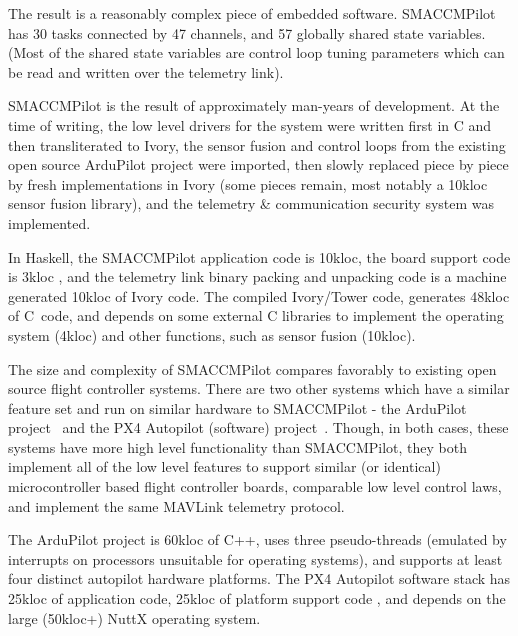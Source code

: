 The result is a reasonably complex piece of embedded software.  SMACCMPilot has
30 tasks connected by 47 channels, and 57 globally shared state variables. (Most
of the shared state variables are control loop tuning parameters which can be
read and written over the telemetry link).


SMACCMPilot is the result of approximately  man-years of development. At the
time of writing, the low level drivers for the system were written first in C
and then transliterated to Ivory, the sensor fusion and control loops from the
existing open source ArduPilot project were imported, then slowly replaced piece
by piece by fresh implementations in Ivory (some pieces remain, most notably a
10kloc sensor fusion library), and the telemetry \& communication security
system was implemented.

In Haskell, the SMACCMPilot application code is 10kloc, the board support code
is 3kloc , and the telemetry link binary packing and unpacking
code is a machine generated 10kloc of Ivory code. The compiled Ivory/Tower code,
generates 48kloc of C~code, and depends on some external C libraries to
implement the operating system (4kloc) and other functions, such as sensor
fusion (10kloc).

The size and complexity of SMACCMPilot compares favorably to existing open
source flight controller systems. There are two other systems which have a
similar feature set and run on similar hardware to SMACCMPilot - the ArduPilot
project~\cite{apm-proj} and the PX4 Autopilot (software)
project~\cite{px4-proj}. Though, in both cases, these systems have
more high level functionality than SMACCMPilot, they both implement all of the
low level features to support similar (or identical) microcontroller based
flight controller boards, comparable low level control laws, and implement the
same MAVLink telemetry protocol.

The ArduPilot project is 60kloc of C++, uses three pseudo-threads (emulated by
interrupts on processors unsuitable for operating systems), and supports at
least four distinct autopilot hardware platforms. The PX4 Autopilot software
stack has 25kloc of application code, 25kloc of platform support code , and
depends on the large (50kloc+) NuttX operating system.

